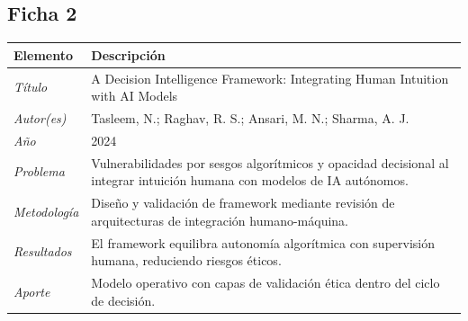 \documentclass[conference]{IEEEtran}
\begin{document}
\subsection*{Ficha 2}
\begin{center}
\small
\begin{minipage}{\columnwidth}
\label{tab:ficha2}
\begin{tabular}{p{1.6cm} p{5.9cm}}
\toprule
\textbf{Elemento} & \textbf{Descripción} \\
\midrule
\textit{Título} & A Decision Intelligence Framework: Integrating Human Intuition with AI Models \\
\addlinespace
\textit{Autor(es)} & Tasleem, N.; Raghav, R. S.; Ansari, M. N.; Sharma, A. J. \\
\addlinespace
\textit{Año} & 2024 \\
\addlinespace
\textit{Problema} & Vulnerabilidades por sesgos algorítmicos y opacidad decisional al integrar intuición humana con modelos de IA autónomos. \\
\addlinespace
\textit{Metodología} & Diseño y validación de framework mediante revisión de arquitecturas de integración humano-máquina. \\
\addlinespace
\textit{Resultados} & El framework equilibra autonomía algorítmica con supervisión humana, reduciendo riesgos éticos. \\
\addlinespace
\textit{Aporte} & Modelo operativo con capas de validación ética dentro del ciclo de decisión. \\
\bottomrule
\end{tabular}
\end{minipage}
\end{center}
 
\end{document}
